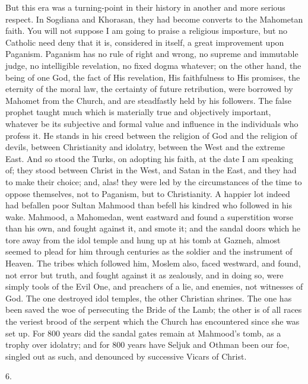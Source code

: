 But this era was a
turning-point in their history in another and more serious respect. In
Sogdiana and Khorasan, they had become converts to the Mahometan
faith. You will not suppose I am going to praise a religious
imposture, but no Catholic need deny that it is, considered in itself,
a great improvement upon Paganism. Paganism has no rule of right and
wrong, no supreme and immutable judge, no intelligible revelation, no
fixed dogma whatever; on the other hand, the being of one God, the
fact of His revelation, His faithfulness to His promises, the eternity
of the moral law, the certainty of future retribution, were borrowed
by Mahomet from the Church, and are steadfastly held by his followers.
The false prophet taught much which is materially true and objectively
important, whatever be its subjective and formal value and influence
in the individuals who profess it. He stands in his creed between the
religion of God and the religion of devils, between Christianity and
idolatry, between the West and the extreme East. And so stood the
Turks, on adopting his faith, at the date I am speaking of; they stood
between Christ in the West, and Satan in the East, and they had to
make their choice; and, alas! they were led by the circumstances of
the time to oppose themselves, not to Paganism, but to Christianity. A
happier lot indeed had befallen poor Sultan Mahmood than befell his
kindred who followed in his wake. Mahmood, a Mahomedan, went eastward
and found a superstition worse than his own, and fought against it,
and smote it; and the sandal doors which he tore away from the
idol temple and hung up at his tomb at Gazneh, almost seemed to plead
for him through centuries as the soldier and the instrument of Heaven.
The tribes which followed him, Moslem also, faced westward, and found,
not error but truth, and fought against it as zealously, and in doing
so, were simply tools of the Evil One, and preachers of a lie, and
enemies, not witnesses of God. The one destroyed idol temples, the
other Christian shrines. The one has been saved the woe of persecuting
the Bride of the Lamb; the other is of all races the veriest brood of
the serpent which the Church has encountered since she was set up. For
800 years did the sandal gates remain at Mahmood's tomb, as a trophy
over idolatry; and for 800 years have Seljuk and Othman been our foe,
singled out as such, and denounced by successive Vicars of Christ.

6.

